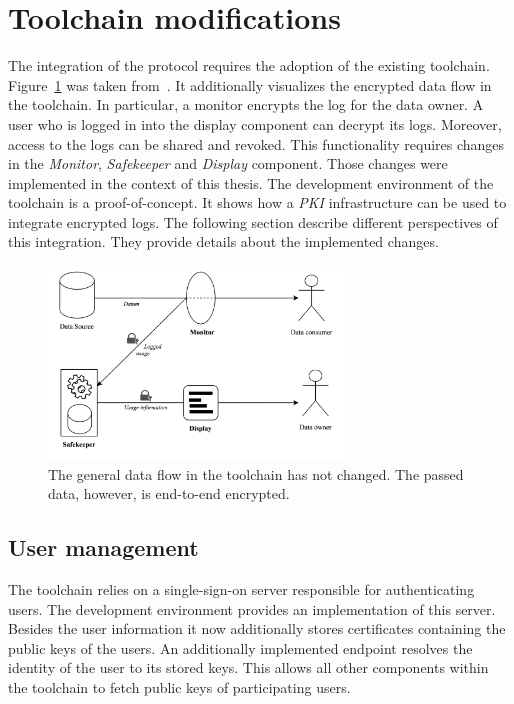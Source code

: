 \documentclass[../main.tex]{subfiles}
\begin{document}
\section{Toolchain modifications}
\label{sec:toolchain-modifications}
The integration of the protocol requires the adoption of the existing toolchain.
Figure~\ref{fig:encrypted-toolchain} was taken from~\cite{Zieglmeier2021}.
It additionally visualizes the encrypted data flow in the toolchain.
In particular, a monitor encrypts the log for the data owner.
A user who is logged in into the display component can decrypt its logs.
Moreover, access to the logs can be shared and revoked.
This functionality requires changes in the \textit{Monitor}, \textit{Safekeeper} and \textit{Display} component.
Those changes were implemented in the context of this thesis.
The development environment of the toolchain is a proof-of-concept.
It shows how a \textit{PKI} infrastructure can be used to integrate encrypted logs.
The following section describe different perspectives of this integration.
They provide details about the implemented changes.


\begin{figure}[h!]
    \includegraphics[width=8cm]{../img/06/encrypted_toolchain.jpg}
    \centering
    \caption{The general data flow in the toolchain has not changed. The passed data, however, is end-to-end encrypted.}
    \label{fig:encrypted-toolchain}
\end{figure}

\subsection{User management}
The toolchain relies on a single-sign-on server responsible for authenticating users.
The development environment provides an implementation of this server.
Besides the user information it now additionally stores certificates containing the public keys of the users.
An additionally implemented endpoint resolves the identity of the user to its stored keys.
This allows all other components within the toolchain to fetch public keys of participating users.
\end{document}

